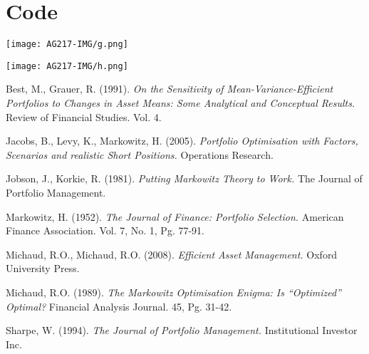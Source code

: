 \documentclass[11pt, english]{article}
\begin{document}
\newpage


\section*{Code}

	\begin{center}
                \texttt{[image: AG217-IMG/g.png]}    
        \end{center}

	\begin{center}             
                \texttt{[image: AG217-IMG/h.png]}    
        \end{center}

\newpage

\renewcommand\refname{Bibliography}

\begin{thebibliography}{9}

		Best, M., Grauer, R. (1991).
		\textsl{On the Sensitivity of Mean-Variance-Efficient Portfolios to Changes in Asset Means: Some Analytical and Conceptual Results.}
		Review of Financial Studies. Vol. 4.

		Jacobs, B., Levy, K., Markowitz, H. (2005). 
		\textsl{Portfolio Optimisation with Factors, Scenarios and realistic Short Positions.}
		Operations Research.

		Jobson, J., Korkie, R. (1981).
		\textsl{Putting Markowitz Theory to Work.}
		The Journal of Portfolio Management.

		Markowitz, H. (1952).
		\textsl{The Journal of Finance: Portfolio Selection.}
		American Finance Association. Vol. 7, No. 1, Pg. 77-91.

		Michaud, R.O., Michaud, R.O. (2008).
		\textsl{Efficient Asset Management.}
		Oxford University Press.

		Michaud, R.O. (1989).
		\textsl{The Markowitz Optimisation Enigma: Is ``Optimized'' Optimal?}
		Financial Analysis Journal. 45, Pg. 31-42.

		Sharpe, W. (1994).
		\textsl{The Journal of Portfolio Management.}
		Institutional Investor Inc.

\end{thebibliography}
\end{document}
